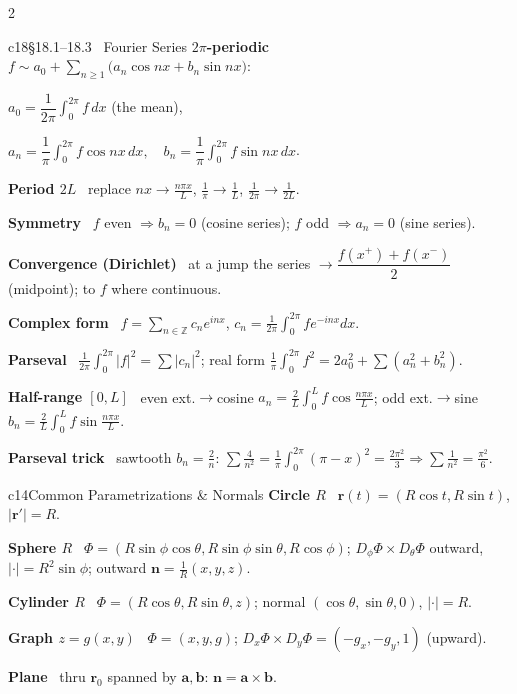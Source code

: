 \documentclass[10pt]{extarticle}
\newcommand{\h}[1]{{\bfseries #1}\ }
\newcommand{\n}{\mathbf{n}}
\newcommand{\rr}{\mathbf{r}}
\begin{document}
\begin{multicols}{2}
\begin{tbox}{c18}{§18.1--18.3 \ Fourier Series}
\h{$2\pi$-periodic} $f\sim a_0+\sum_{n\ge1}\!\big(a_n\cos nx+b_n\sin nx\big)$:\par
$a_0=\dfrac1{2\pi}\!\displaystyle\int_{0}^{2\pi}\!\! f\,dx$ (the mean),\par
$a_n=\dfrac1{\pi}\!\displaystyle\int_{0}^{2\pi}\!\! f\cos nx\,dx,\quad b_n=\dfrac1{\pi}\!\displaystyle\int_{0}^{2\pi}\!\! f\sin nx\,dx$.\par
\h{Period $2L$} replace $nx\to\frac{n\pi x}{L}$, $\frac1\pi\to\frac1L$, $\frac1{2\pi}\to\frac1{2L}$.\par
\h{Symmetry} $f$ even $\Rightarrow b_n{=}0$ (cosine series); $f$ odd $\Rightarrow a_n{=}0$ (sine series).\par
\h{Convergence (Dirichlet)} at a jump the series $\to\dfrac{f(x^+)+f(x^-)}{2}$ (midpoint); to $f$ where continuous.\par
\h{Complex form} $f=\sum_{n\in\mathbb Z} c_n e^{inx}$, $c_n=\frac1{2\pi}\!\int_0^{2\pi}\! f e^{-inx}dx$.\par
\h{Parseval} $\frac1{2\pi}\!\int_0^{2\pi}\!|f|^2=\sum|c_n|^2$;\; real form $\frac1\pi\!\int_0^{2\pi}\! f^2=2a_0^2+\sum(a_n^2+b_n^2)$.\par
\h{Half-range $[0,L]$} even ext.$\to$cosine $a_n{=}\frac2L\!\int_0^L\! f\cos\frac{n\pi x}{L}$; odd ext.$\to$sine $b_n{=}\frac2L\!\int_0^L\! f\sin\frac{n\pi x}{L}$.\par
\h{Parseval trick} sawtooth $b_n{=}\frac2n$: $\sum\frac4{n^2}{=}\frac1\pi\!\int_0^{2\pi}\!(\pi{-}x)^2{=}\frac{2\pi^2}3\Rightarrow\sum\frac1{n^2}{=}\frac{\pi^2}6$.
\end{tbox}

\begin{tbox}{c14}{Common Parametrizations \& Normals}
\h{Circle $R$} $\rr(t)=(R\cos t,R\sin t)$, $|\rr'|=R$.\par
\h{Sphere $R$} $\Phi=(R\sin\phi\cos\theta,R\sin\phi\sin\theta,R\cos\phi)$; $D_\phi\Phi\times D_\theta\Phi$ outward, $|{\cdot}|=R^{2}\sin\phi$; outward $\n=\frac1R(x,y,z)$.\par
\h{Cylinder $R$} $\Phi=(R\cos\theta,R\sin\theta,z)$; normal $(\cos\theta,\sin\theta,0)$, $|{\cdot}|=R$.\par
\h{Graph $z=g(x,y)$} $\Phi=(x,y,g)$; $D_x\Phi\times D_y\Phi=(-g_x,-g_y,1)$ (upward).\par
\h{Plane} thru $\rr_0$ spanned by $\mathbf a,\mathbf b$: $\n=\mathbf a\times\mathbf b$.
\end{tbox}


\end{multicols}
\end{document}
